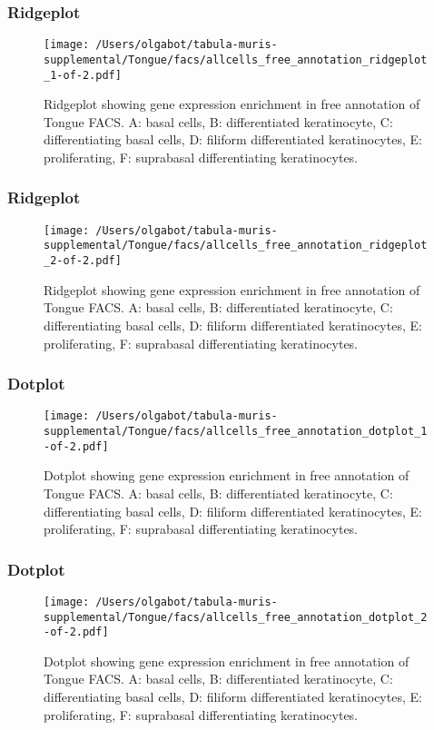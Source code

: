 \newpage
\subsubsection{Ridgeplot}
\begin{figure}[h]
\centering
\texttt{[image: /Users/olgabot/tabula-muris-supplemental/Tongue/facs/allcells\_free\_annotation\_ridgeplot\_1-of-2.pdf]}

\caption{ Ridgeplot  showing gene expression enrichment in free annotation of Tongue FACS. A: basal cells, B: differentiated keratinocyte, C: differentiating basal cells, D: filiform differentiated keratinocytes, E: proliferating, F: suprabasal differentiating keratinocytes.}
\end{figure}


\newpage
\newpage
\subsubsection{Ridgeplot}
\begin{figure}[h]
\centering
\texttt{[image: /Users/olgabot/tabula-muris-supplemental/Tongue/facs/allcells\_free\_annotation\_ridgeplot\_2-of-2.pdf]}

\caption{ Ridgeplot  showing gene expression enrichment in free annotation of Tongue FACS. A: basal cells, B: differentiated keratinocyte, C: differentiating basal cells, D: filiform differentiated keratinocytes, E: proliferating, F: suprabasal differentiating keratinocytes.}
\end{figure}


\newpage
\newpage
\subsubsection{Dotplot}
\begin{figure}[h]
\centering
\texttt{[image: /Users/olgabot/tabula-muris-supplemental/Tongue/facs/allcells\_free\_annotation\_dotplot\_1-of-2.pdf]}

\caption{ Dotplot  showing gene expression enrichment in free annotation of Tongue FACS. A: basal cells, B: differentiated keratinocyte, C: differentiating basal cells, D: filiform differentiated keratinocytes, E: proliferating, F: suprabasal differentiating keratinocytes.}
\end{figure}


\newpage
\newpage
\subsubsection{Dotplot}
\begin{figure}[h]
\centering
\texttt{[image: /Users/olgabot/tabula-muris-supplemental/Tongue/facs/allcells\_free\_annotation\_dotplot\_2-of-2.pdf]}

\caption{ Dotplot  showing gene expression enrichment in free annotation of Tongue FACS. A: basal cells, B: differentiated keratinocyte, C: differentiating basal cells, D: filiform differentiated keratinocytes, E: proliferating, F: suprabasal differentiating keratinocytes.}
\end{figure}

